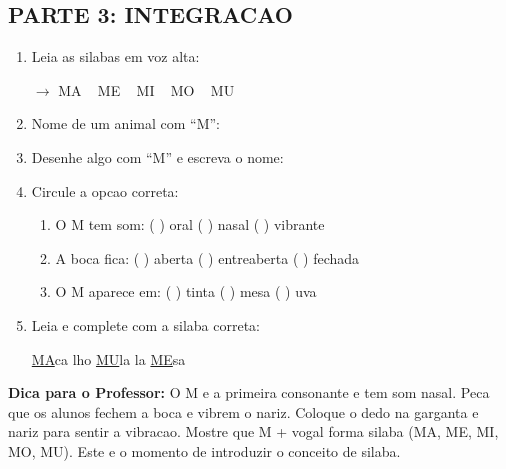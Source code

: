 \begin{exercicio}
\subsection*{PARTE 3: INTEGRACAO}

\begin{enumerate}[resume]
  \item Leia as silabas em voz alta:
  \begin{center}
  $\rightarrow$ MA  ~  ME  ~  MI  ~  MO  ~  MU
  \end{center}

  \item Nome de um animal com ``M'':
  \begin{center}
  \underline{\hspace{6cm}}
  \end{center}

  \item Desenhe algo com ``M'' e escreva o nome:
  \begin{center}
  \end{center}

  \item Circule a opcao correta:
  \begin{enumerate}[label=(\alph*)]
    \item O M tem som: ( ) oral ( ) nasal ( ) vibrante
    \item A boca fica: ( ) aberta ( ) entreaberta ( ) fechada
    \item O M aparece em: ( ) tinta ( ) mesa ( ) uva
  \end{enumerate}

  \item Leia e complete com a silaba correta:
  \begin{center}
  \underline{MA}ca \quad {}lho \quad \underline{MU}la \quad {}la \quad \underline{ME}sa
  \end{center}
\end{enumerate}
\end{exercicio}

\begin{dica}
\textbf{Dica para o Professor:} O M e a primeira consonante e tem som nasal. Peca que os alunos fechem a boca e vibrem o nariz. Coloque o dedo na garganta e nariz para sentir a vibracao. Mostre que M + vogal forma silaba (MA, ME, MI, MO, MU). Este e o momento de introduzir o conceito de silaba.
\end{dica}

